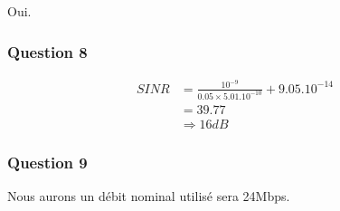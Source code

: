 Oui.

\subsubsection{Question 8}
\begin{align*}
SINR &= \frac{10^{-9}}{0.05 \times 5.01 . 10^{-10}} + 9.05.10^{-14}\\
    &= 39.77\\
    &\Rightarrow 16 dB
\end{align*}

\subsubsection{Question 9}
Nous aurons un débit nominal utilisé sera 24Mbps.
